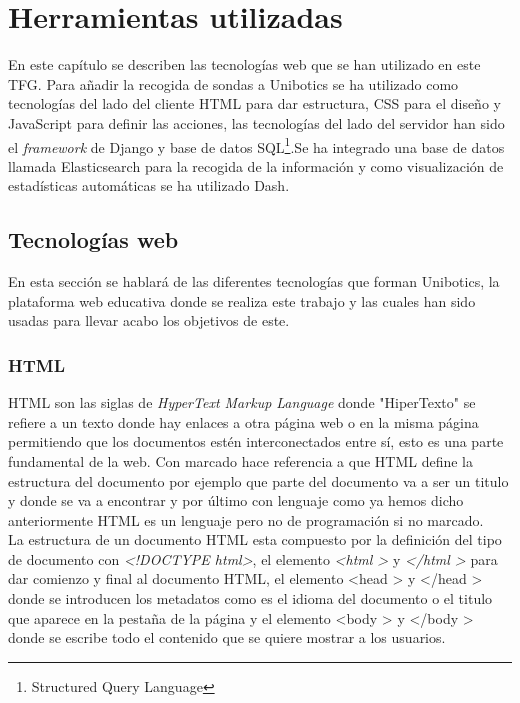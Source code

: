 \chapter{Herramientas utilizadas}
\label{herramientas}
En este capítulo se describen las tecnologías web que se han utilizado en este TFG. Para añadir la recogida de sondas a Unibotics se ha utilizado como tecnologías del lado del cliente HTML para dar estructura, CSS para el diseño y JavaScript para definir las acciones, las tecnologías del lado del servidor han sido el \textit{framework} de Django y base de datos SQL\footnote{Structured Query Language}.Se ha integrado una base de datos llamada Elasticsearch para la recogida de la información y como visualización de estadísticas automáticas se ha utilizado Dash.
\section{Tecnologías web}
En esta sección se hablará de las diferentes tecnologías que forman Unibotics, la plataforma web educativa donde se realiza este trabajo y las cuales han sido usadas para llevar acabo los objetivos de este.
\subsection{HTML}
HTML son las siglas de \textit{HyperText Markup Language} donde "HiperTexto" se refiere a un texto donde hay enlaces a otra página web o en la misma página permitiendo que los documentos estén interconectados entre sí, esto es una parte fundamental de la web. Con marcado hace referencia a que HTML define la estructura del documento por ejemplo que parte del documento va a ser un titulo y donde se va a encontrar y por último con lenguaje como ya hemos dicho anteriormente HTML es un lenguaje pero no de programación si no marcado.\\

La estructura de un documento HTML esta compuesto por la definición del tipo de documento con \textit{\textless!DOCTYPE html\textgreater}, el elemento  \textit{\textless html \textgreater} y \textit{\textless/html \textgreater} para dar comienzo y final al documento HTML, el elemento {\textless head \textgreater} y {\textless/head \textgreater} donde se introducen los metadatos como es el idioma del documento o el titulo que aparece en la pestaña de la página y el elemento {\textless body \textgreater} y {\textless/body \textgreater} donde se escribe todo el contenido que se quiere mostrar a los usuarios.\cite{html}

